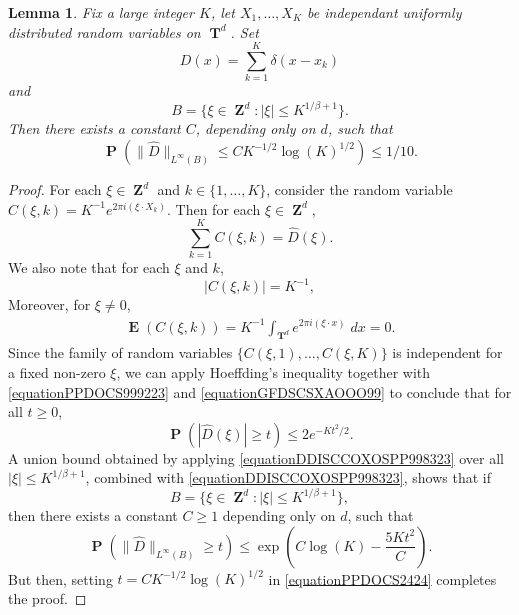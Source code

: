 \documentclass[12pt,reqno]{article}
\numberwithin{equation}{section}
\DeclareMathOperator{\ZZ}{\mathbf{Z}}
\DeclareMathOperator{\TT}{\mathbf{T}}
\newtheorem{lemma}[theorem]{Lemma}
\DeclareMathOperator{\EE}{\mathbf{E}}
\DeclareMathOperator{\PP}{\mathbf{P}}
\begin{document}
\begin{lemma} \label{LemmaGISCICS1}
    Fix a large integer $K$, let $X_1, \dots, X_K$ be independant uniformly distributed random variables on $\TT^d$. Set
    \[ D(x) = \sum_{k = 1}^K \delta(x - x_k) \]
    and
    \[ B = \{ \xi \in \ZZ^d: |\xi| \leq K^{1/\beta + 1} \}. \]
    Then there exists a constant $C$, depending only on $d$, such that
    \[ \PP \left( \| \widehat{D} \|_{L^\infty(B)} \leq C K^{-1/2} \log(K)^{1/2} \right) \leq 1/10. \]
\end{lemma}
\begin{proof}
    For each $\xi \in \ZZ^d$ and $k \in \{ 1, \dots, K \}$, consider the random variable $C(\xi,k) = K^{-1} e^{2 \pi i (\xi \cdot X_k)}$. Then for each $\xi \in \ZZ^d$,
    \begin{equation} \label{equationPPDOCS999223}
        \sum_{k = 1}^K C(\xi,k) = \widehat{D}(\xi).
    \end{equation}
    We also note that for each $\xi$ and $k$,
    \begin{equation} \label{equationGFDSCSXAOOO99}
        |C(\xi,k)| = K^{-1},
    \end{equation}
    Moreover, for $\xi \neq 0$,
    \begin{align*}
        \EE(C(\xi,k)) = K^{-1} \int_{\TT^d} e^{2 \pi i (\xi \cdot x)}\; dx = 0.
    \end{align*}
    Since the family of random variables $\{ C(\xi,1), \dots, C(\xi,K) \}$ is independent for a fixed non-zero $\xi$, we can apply Hoeffding's inequality together with \eqref{equationPPDOCS999223} and \eqref{equationGFDSCSXAOOO99} to conclude that for all $t \geq 0$,
    \begin{equation} \label{equationDDISCCOXOSPP998323}
        \PP \left( |\widehat{D}(\xi)| \geq t \right) \leq 2 e^{-Kt^2/2}.
    \end{equation}
    A union bound obtained by applying \eqref{equationDDISCCOXOSPP998323} over all $|\xi| \leq K^{1/\beta+1}$, combined with \eqref{equationDDISCCOXOSPP998323}, shows that if
    \[ B = \{ \xi \in \ZZ^d : |\xi| \leq K^{1/\beta + 1} \}, \]
    then there exists a constant $C \geq 1$ depending only on $d$, such that
    \begin{equation} \label{equationPPDOCS2424}
        \PP \left( \| \widehat{D} \|_{L^\infty(B)} \geq t \right) \leq \exp \left( C \log(K) - \frac{5K t^2}{C} \right).
    \end{equation}
    But then, setting $t = CK^{-1/2} \log(K)^{1/2}$ in \eqref{equationPPDOCS2424} completes the proof.
\end{proof}
\end{document}
